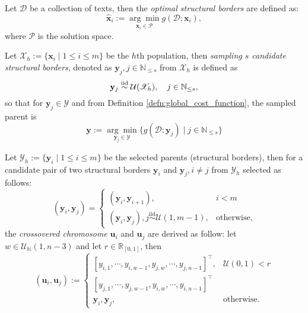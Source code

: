 \begin{defn}\label{defn:optimal_structural_borders}
    Let $\mathscr{D}$ be a collection of texts, then the \textit{optimal structural borders} are defined as:
    \begin{equation}
        \hat{\mathbf{x}}_{i}:=\underset{\mathbf{x}_i\in\mathscr{P}}{\arg\min}g(\mathscr{D};\mathbf{x}_i),
    \end{equation}
    where $\mathscr{P}$ is the solution space.
\end{defn}

\begin{defn}\label{defn:sampling_parents}
    Let $\mathscr{X}_h:=\{\mathbf{x}_{i}\mid 1\leq i\leq m\}$ be the $h$th population, then \textit{sampling $s$ candidate structural borders}, denoted as $\mathbf{y}_j, j \in\mathbb{N}_{\leq s}$ from $\mathscr{X}_h$ is defined as
    \begin{equation}
        \mathbf{y}_j\overset{\textnormal{iid}}{\sim}\mathcal{U}(\mathscr{X}_h),\quad j\in\mathbb{N}_{\leq s},
    \end{equation}
    so that for $\mathbf{y}_j\in\mathscr{Y}$ and from Definition \ref{defn:global_cost_function}, the sampled parent is
    \begin{equation}
        \mathbf{y}:=\underset{\mathbf{y}_j\in\mathscr{Y}}{\arg\min}\{g(\mathscr{D};\mathbf{y}_j)\mid j \in\mathbb{N}_{\leq s}\}
    \end{equation}
\end{defn}

\begin{defn}\label{defn:chromosome_crossover}
    Let $\mathscr{Y}_h:=\{\mathbf{y}_{i}\mid 1\leq i \leq m\}$ be the selected parents (structural borders), then for a candidate pair of two structural borders $\mathbf{y}_i$ and $\mathbf{y}_j, i\neq j$ from $\mathscr{Y}_h$ selected as follows:
    \begin{equation}
        (\mathbf{y}_i, \mathbf{y}_j)=\begin{cases}
            (\mathbf{y}_i,\mathbf{y}_{i+1}),&i< m\\
            (\mathbf{y}_i,\mathbf{y}_{j}), j\overset{\text{iid}}{\sim}\mathcal{U}(1,m-1),&\text{otherwise},
        \end{cases}
    \end{equation}
    the \textit{crossovered chromosome} $\mathbf{u}_i$ and $\mathbf{u}_j$ are derived as follow: let $w\in\mathcal{U}_{\mathbb{N}}(1,n-3)$ and let $r\in\mathbb{R}_{[0,1]}$, then
    \begin{equation}
        (\mathbf{u}_i,\mathbf{u}_j):=\begin{cases}
            [y_{i,1},\cdots,y_{i,w-1},y_{j,w},\cdots,y_{j,n-1}]^{\top},&\mathcal{U}(0,1)< r\\
            [y_{j,1},\cdots,y_{j,w-1},y_{i,w},\cdots,y_{i,n-1}]^{\top}&\\[0.3cm]
            \mathbf{y}_i,\mathbf{y}_j,&\text{otherwise}.
        \end{cases}
    \end{equation}
\end{defn}

